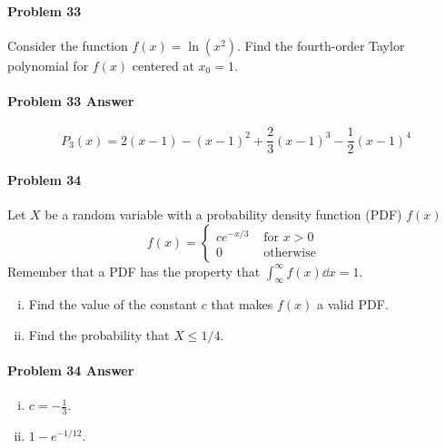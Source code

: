 \documentclass[a4paper, 11pt]{article}
\begin{document}

\paragraph{Problem 33}
Consider the function $f(x) = \ln(x^2)$.
Find the fourth-order Taylor polynomial for $f(x)$ centered at $x_0=1$.


\paragraph{Problem 33 Answer}
\[
	P_3(x) = 2(x-1) - (x-1)^2 + \frac{2}{3}(x-1)^3 - \frac{1}{2}(x-1)^4
\]


\paragraph{Problem 34}
Let $X$ be a random variable with a probability density function (PDF) $f(x)$
\[
	f(x) = \begin{cases}
 				ce^{-x/3} & \text{ for } x > 0 \\
 				0 & \text{ otherwise }
 		   \end{cases}
\]
Remember that a PDF has the property that $\int_{\infty}^{\infty} f(x)\dd x = 1$.
\begin{enumerate}[(i)]
	\item Find the value of the constant $c$ that makes $f(x)$ a valid PDF.
	\item Find the probability that $X \leq 1/4$.
\end{enumerate}


\paragraph{Problem 34 Answer}
\begin{enumerate}[(i)]
	\item $c = - \frac{1}{3}$.
	\item $1 - e^{-1/12}$.
\end{enumerate}
\end{document}
